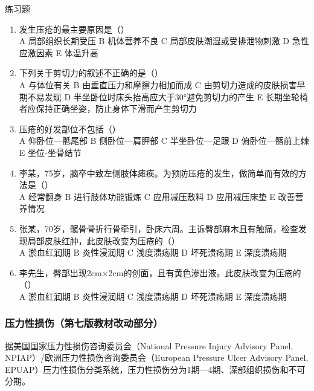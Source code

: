 \documentclass[11pt, a4paper]{ctexart}
\begin{document}
\begin{examplebox}{练习题}
	\begin{enumerate}
		\item 发生压疮的最主要原因是（\qquad）\\
		      A 局部组织长期受压 \quad B 机体营养不良 \quad C 局部皮肤潮湿或受排泄物刺激 \quad D 急性应激因素 \quad E 体温升高
		\item 下列关于剪切力的叙述不正确的是（\qquad）\\
		      A 与体位有关 \quad B 由垂直压力和摩擦力相加而成 \quad C 由剪切力造成的皮肤损害早期不易发现 \quad D 半坐卧位时床头抬高应大于30°避免剪切力的产生 \quad E 长期坐轮椅者应保持正确坐姿，防止身体下滑而产生剪切力
		\item 压疮的好发部位不包括（\qquad）\\
		      A 仰卧位—骶尾部 \quad B 侧卧位—肩胛部 \quad C 半坐卧位—足跟 \quad D 俯卧位—髂前上棘 \quad E 坐位-坐骨结节
		\item 李某，75岁，脑卒中致左侧肢体瘫痪。为预防压疮的发生，做简单而有效的方法是（\qquad）\\
		      A 经常翻身 \quad B 进行肢体功能锻炼 \quad C 应用减压敷料 \quad D 应用减压床垫 \quad E 改善营养情况
		\item 张某，70岁，髋骨骨折行骨牵引，卧床六周。主诉臀部麻木且有触痛，检查发现局部皮肤红肿，此皮肤改变为压疮的（\qquad）\\
		      A 淤血红润期 \quad B 炎性浸润期 \quad C 浅度溃疡期 \quad D 坏死溃疡期 \quad E 深度溃疡期
		\item 李先生，臀部出现2cm×2cm的创面，且有黄色渗出液。此皮肤改变为压疮的（\qquad）\\
		      A 淤血红润期 \quad B 炎性浸润期 \quad C 浅度溃疡期 \quad D 坏死溃疡期 \quad E 深度溃疡期
	\end{enumerate}
\end{examplebox}

\subsubsection{压力性损伤（第七版教材改动部分）}
据美国国家压力性损伤咨询委员会（National Pressure Injury Advisory Panel, NPIAP）/欧洲压力性损伤咨询委员会（European Pressure Ulcer Advisory Panel, EPUAP）压力性损伤分类系统，压力性损伤分为1期—4期、深部组织损伤和不可分期。
\end{document}
